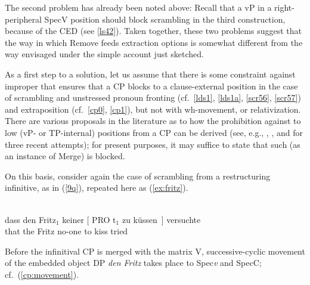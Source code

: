 \documentclass[output=paper]{langsci/langscibook}
\begin{document}
The second problem has already been noted above: Recall that a vP in a
right-peripheral SpecV position should block scrambling in the third
construction, because of the \gls{CED} (see \eqref{ls42}). Taken together,
these two problems suggest that the way in which Remove feeds extraction
options is somewhat different from the way envisaged under the simple account
just sketched.

As a first step to a solution, let us assume that there is some constraint
against improper  that ensures that a CP blocks  to a
clause-external position in the case of scrambling and unstressed pronoun
fronting (cf.\ \eqref{lds1}, \eqref{lds1a}, \eqref{scr56}, \eqref{scr57}) and
extraposition (cf.\ \eqref{cp0}, \eqref{cp1}), but not with wh-movement,
 or relativization.  There are various proposals in the
literature as to how the prohibition against  to low (vP- or
TP-internal) positions from a CP can be derived (see, e.g.,
\citealt[Ch.~2]{Mueller:14:buf}, \citealt{Wurmbrand:15}, and \citealt{Keine:16}
for three recent attempts); for present purposes, it may suffice to state that
such  (as an instance of Merge) is blocked.

On this basis, consider again the case of scrambling from a restructuring
infinitive, as in (\ref{9q}), repeated here as (\ref{ex:fritz}).\newpage

\ea\label{ex:fritz} \\
    \gll dass \label{fdsc4}den Fritz$_1$ keiner [ PRO t$_1$ zu küssen~] versuchte\\
        that the Fritz\textsubscript{\Acc} no-one\textsubscript{\Nom} {} {} {}  to kiss tried\\
\z

Before the infinitival CP is merged with the matrix V, successive-cyclic
movement of the embedded object DP {\it den Fritz} takes place to Spec\emph{v}
and SpecC; cf.\ (\ref{cp:movement}).
\end{document}
